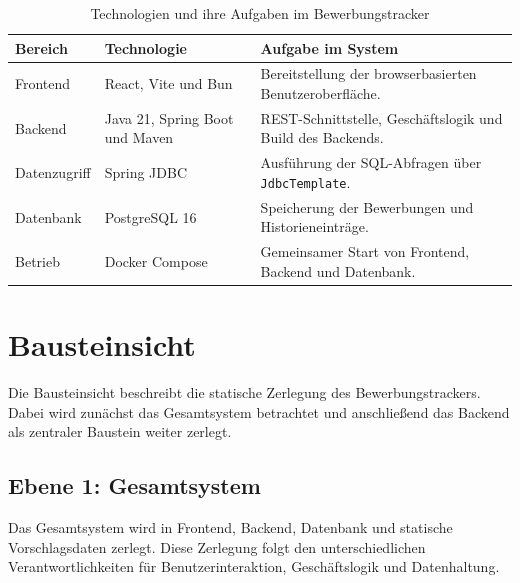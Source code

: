 \documentclass[a4paper,11pt]{article}
\begin{document}
\begin{table}[H]
\centering
\begin{tabularx}{\textwidth}{L{2.7cm} L{3.8cm} Y}
\toprule
\textbf{Bereich} & \textbf{Technologie} & \textbf{Aufgabe im System} \\
\midrule

Frontend &
React, Vite und Bun &
Bereitstellung der browserbasierten Benutzeroberfläche. \\

Backend &
Java 21, Spring Boot und Maven &
REST-Schnittstelle, Geschäftslogik und Build des Backends. \\

Datenzugriff &
Spring JDBC &
Ausführung der SQL-Abfragen über \texttt{JdbcTemplate}. \\

Datenbank &
PostgreSQL 16 &
Speicherung der Bewerbungen und Historieneinträge. \\

Betrieb &
Docker Compose &
Gemeinsamer Start von Frontend, Backend und Datenbank. \\

\bottomrule
\end{tabularx}
\caption{Technologien und ihre Aufgaben im Bewerbungstracker}
\label{tab:technology-strategy}
\end{table}






\newpage
\section{Bausteinsicht}
\label{sec:building-block-view}

Die Bausteinsicht beschreibt die statische Zerlegung des Bewerbungstrackers.
Dabei wird zunächst das Gesamtsystem betrachtet und anschließend das Backend als zentraler Baustein weiter zerlegt.


\subsection{Ebene 1: Gesamtsystem}

Das Gesamtsystem wird in Frontend, Backend, Datenbank und statische Vorschlagsdaten zerlegt.
Diese Zerlegung folgt den unterschiedlichen Verantwortlichkeiten für Benutzerinteraktion, Geschäftslogik und Datenhaltung.
\end{document}
